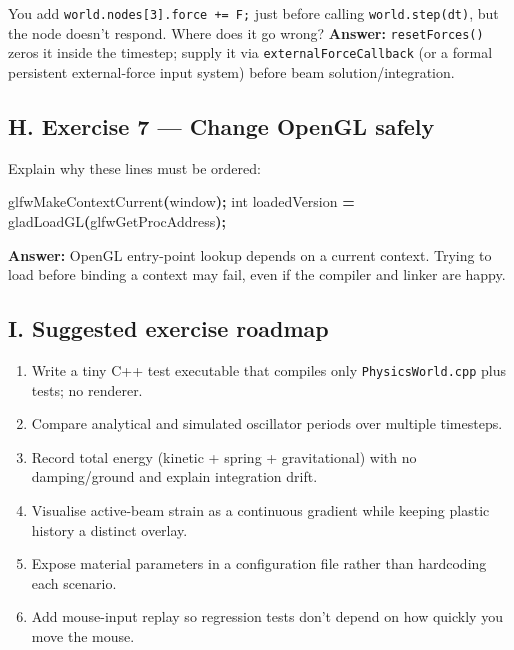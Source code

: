 \documentclass[
  10pt,
  a4paper,
]{article}
\newenvironment{Shaded}{\begin{snugshade}}{\end{snugshade}}
\newcommand{\DataTypeTok}[1]{\textcolor[rgb]{0.13,0.29,0.53}{#1}}
\newcommand{\NormalTok}[1]{#1}
\newcommand{\OperatorTok}[1]{\textcolor[rgb]{0.81,0.36,0.00}{\textbf{#1}}}
\providecommand{\tightlist}{%
  \setlength{\itemsep}{0pt}\setlength{\parskip}{0pt}}
\begin{document}
You add \texttt{world.nodes{[}3{]}.force\ +=\ F;} just before calling
\texttt{world.step(dt)}, but the node doesn't respond. Where does it go
wrong? \textbf{Answer:} \texttt{resetForces()} zeros it inside the
timestep; supply it via \texttt{externalForceCallback} (or a formal
persistent external-force input system) before beam
solution/integration.

\subsection{H. Exercise 7 --- Change OpenGL
safely}\label{h.-exercise-7-change-opengl-safely}

Explain why these lines must be ordered:

\begin{Shaded}
\begin{Highlighting}[]
\NormalTok{glfwMakeContextCurrent}\OperatorTok{(}\NormalTok{window}\OperatorTok{);}
\DataTypeTok{int}\NormalTok{ loadedVersion }\OperatorTok{=}\NormalTok{ gladLoadGL}\OperatorTok{(}\NormalTok{glfwGetProcAddress}\OperatorTok{);}
\end{Highlighting}
\end{Shaded}

\textbf{Answer:} OpenGL entry-point lookup depends on a current context.
Trying to load before binding a context may fail, even if the compiler
and linker are happy.

\subsection{I. Suggested exercise
roadmap}\label{i.-suggested-exercise-roadmap}

\begin{enumerate}
\def\labelenumi{\arabic{enumi}.}
\tightlist
\item
  Write a tiny C++ test executable that compiles only
  \texttt{PhysicsWorld.cpp} plus tests; no renderer.
\item
  Compare analytical and simulated oscillator periods over multiple
  timesteps.
\item
  Record total energy (kinetic + spring + gravitational) with no
  damping/ground and explain integration drift.
\item
  Visualise active-beam strain as a continuous gradient while keeping
  plastic history a distinct overlay.
\item
  Expose material parameters in a configuration file rather than
  hardcoding each scenario.
\item
  Add mouse-input replay so regression tests don't depend on how quickly
  you move the mouse.
\end{enumerate}
\end{document}
